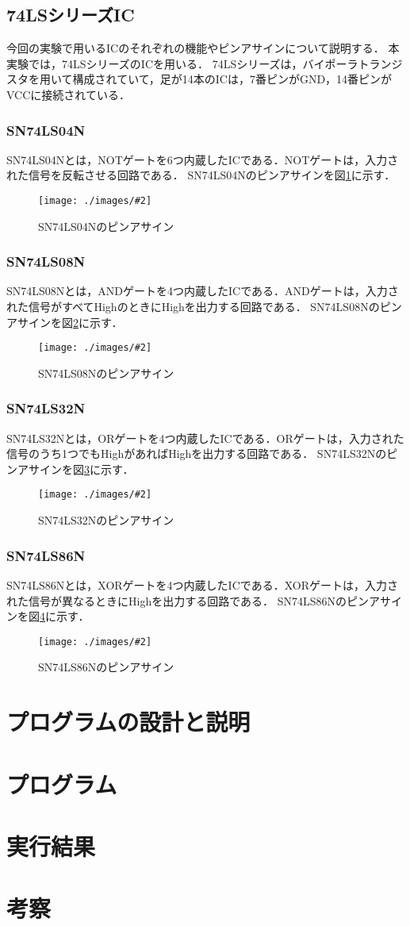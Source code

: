 \documentclass[a4j]{jarticle}
\newcommand{\Figure}[4]{
\begin{figure}[H]
\centering
\texttt{[image: ./images/\#2]}
\caption{#3}
\label{fig:#4}
\end{figure}
}
\begin{document}
\subsection{74LSシリーズIC}
今回の実験で用いるICのそれぞれの機能やピンアサインについて説明する．
本実験では，74LSシリーズのICを用いる．
74LSシリーズは，バイポーラトランジスタを用いて構成されていて，足が14本のICは，7番ピンがGND，14番ピンがVCCに接続されている．

\subsubsection{SN74LS04N}
SN74LS04Nとは，NOTゲートを6つ内蔵したICである．NOTゲートは，入力された信号を反転させる回路である．
SN74LS04Nのピンアサインを図\ref{fig:NOT}に示す．
\Figure{0.4}{SN74LS04N}{SN74LS04Nのピンアサイン}{NOT}

\subsubsection{SN74LS08N}
SN74LS08Nとは，ANDゲートを4つ内蔵したICである．ANDゲートは，入力された信号がすべてHighのときにHighを出力する回路である．
SN74LS08Nのピンアサインを図\ref{fig:AND}に示す．
\Figure{0.4}{SN74LS08N}{SN74LS08Nのピンアサイン}{AND}

\subsubsection{SN74LS32N}
SN74LS32Nとは，ORゲートを4つ内蔵したICである．ORゲートは，入力された信号のうち1つでもHighがあればHighを出力する回路である．
SN74LS32Nのピンアサインを図\ref{fig:OR}に示す．
\Figure{0.4}{SN74LS32N}{SN74LS32Nのピンアサイン}{OR}

\subsubsection{SN74LS86N}
SN74LS86Nとは，XORゲートを4つ内蔵したICである．XORゲートは，入力された信号が異なるときにHighを出力する回路である．
SN74LS86Nのピンアサインを図\ref{fig:XOR}に示す．
\Figure{0.4}{SN74LS86N}{SN74LS86Nのピンアサイン}{XOR}


\section{プログラムの設計と説明}

\section{プログラム}

\section{実行結果}

\section{考察}
\end{document}
